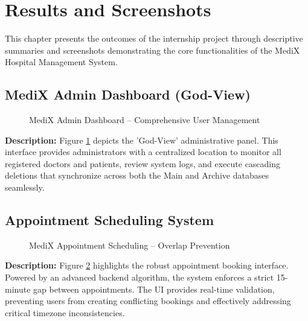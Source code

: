\documentclass[12pt,a4paper]{article}
\begin{document}
\newpage
\section{Results and Screenshots}
\label{chap:results}

This chapter presents the outcomes of the internship project through descriptive summaries and screenshots demonstrating the core functionalities of the MediX Hospital Management System.

\subsection{MediX Admin Dashboard (God-View)}

\begin{figure}[H]
    \centering
    \caption{MediX Admin Dashboard -- Comprehensive User Management}
    \label{fig:admin_dashboard}
\end{figure}

\noindent\textbf{Description:} Figure \ref{fig:admin_dashboard} depicts the 'God-View' administrative panel. This interface provides administrators with a centralized location to monitor all registered doctors and patients, review system logs, and execute cascading deletions that synchronize across both the Main and Archive databases seamlessly.

\subsection{Appointment Scheduling System}

\begin{figure}[H]
    \centering
    \caption{MediX Appointment Scheduling -- Overlap Prevention}
    \label{fig:appointment_scheduling}
\end{figure}

\noindent\textbf{Description:} Figure \ref{fig:appointment_scheduling} highlights the robust appointment booking interface. Powered by an advanced backend algorithm, the system enforces a strict 15-minute gap between appointments. The UI provides real-time validation, preventing users from creating conflicting bookings and effectively addressing critical timezone inconsistencies.
\end{document}
